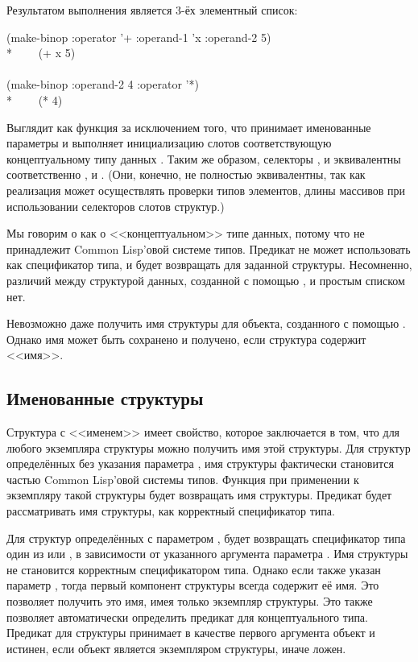 Результатом выполнения  является 3-ёх элементный список:
\begin{lisp}
(make-binop :operator '+ :operand-1 'x :operand-2 5) \\*
~~~\EV\ (+ x 5) \\
\\
(make-binop :operand-2 4 :operator '*) \\*
~~~\EV\ (* {\nil} 4)
\end{lisp}
Выглядит как функция  за исключением того, что принимает именованные
параметры и выполняет инициализацию слотов соответствующую концептуальному типу
данных .
Таким же образом, селекторы ,  и
 эквивалентны соответственно ,  и
. (Они, конечно, не полностью эквивалентны, так как реализация
может осуществлять проверки типов элементов, длины массивов при использовании
селекторов слотов структур.)

Мы говорим о  как о <<концептуальном>> типе данных, потому что
 не принадлежит Common Lisp'овой системе типов. Предикат 
не может использовать  как спецификатор типа, и  будет
возвращать  для заданной  структуры. Несомненно, различий
между структурой данных, созданной с помощью , и простым
списком нет.

Невозможно даже получить имя структуры для объекта, созданного с помощью
. Однако имя может быть сохранено и получено, если структура
содержит <<имя>>.

\subsection{Именованные структуры}

Структура с <<именем>> имеет свойство, которое заключается в том, что для любого
экземпляра структуры можно получить имя этой структуры. Для структур
определённых без указания параметра , имя структуры фактически становится
частью Common Lisp'овой системы типов. Функция  при применении к
экземпляру такой структуры будет возвращать имя структуры. Предикат 
будет рассматривать имя структуры, как корректный спецификатор типа.

Для структур определённых с параметром ,  будет
возвращать спецификатор типа один из  или , в
зависимости от указанного аргумента параметра .  Имя структуры не
становится корректным спецификатором типа. Однако если также указан параметр
, тогда первый компонент структуры всегда содержит её имя. Это
позволяет получить это имя, имея только экземпляр структуры. Это также позволяет
автоматически определить предикат для концептуального типа.  Предикат
 для структуры принимает в качестве первого аргумента объект и
истинен, если объект является экземпляром структуры, иначе ложен.


